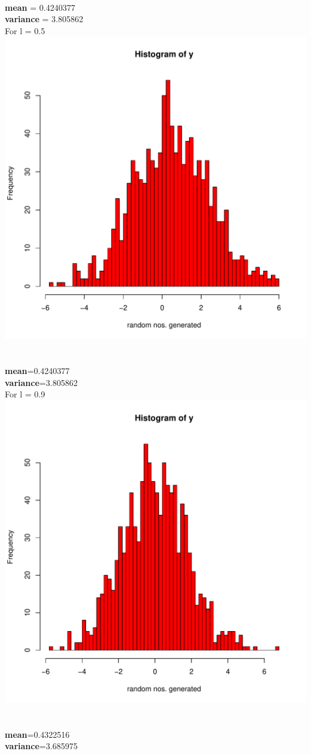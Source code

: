 \documentclass{article}
\begin{document}
\\
\textbf{mean} = 0.4240377\\
\textbf{variance} = 3.805862\\
\newpage
For l = 0.5\\
\includegraphics[scale=0.85]{Q1(5).pdf}\\\\
\\
\textbf{mean}=0.4240377\\
\textbf{variance}=3.805862\\
\newpage
For l = 0.9\\
\includegraphics[scale=0.85]{Q1(6).pdf}\\\\
\\
\textbf{mean}=0.4322516\\
\textbf{variance}=3.685975\\
\end{document}
